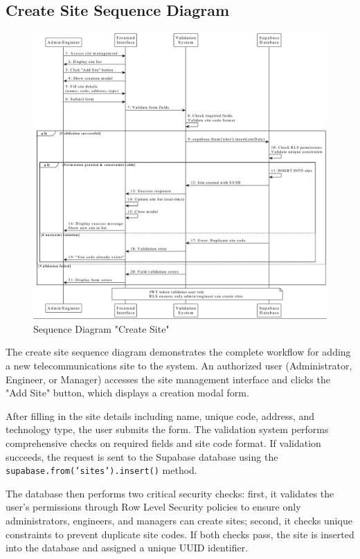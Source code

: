 \subsection{Create Site Sequence Diagram}

\begin{figure}[H]
    \centering
    \includegraphics[width=0.95\linewidth]{img/chap_03/sequence_add_site.png}
    \caption{Sequence Diagram "Create Site"}
    \label{fig:sequence_add_site}
\end{figure}

The create site sequence diagram demonstrates the complete workflow for adding a new telecommunications site to the system. An authorized user (Administrator, Engineer, or Manager) accesses the site management interface and clicks the "Add Site" button, which displays a creation modal form.

After filling in the site details including name, unique code, address, and technology type, the user submits the form. The validation system performs comprehensive checks on required fields and site code format. If validation succeeds, the request is sent to the Supabase database using the \texttt{supabase.from('sites').insert()} method.

The database then performs two critical security checks: first, it validates the user's permissions through Row Level Security policies to ensure only administrators, engineers, and managers can create sites; second, it checks unique constraints to prevent duplicate site codes. If both checks pass, the site is inserted into the database and assigned a unique UUID identifier.

